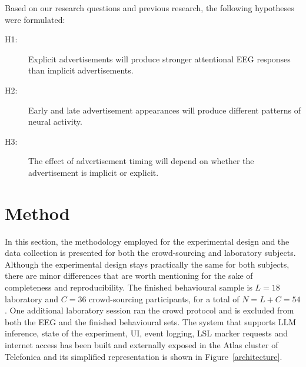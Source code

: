 \documentclass[english]{article}
\begin{document}
Based on our research questions and previous research, the following hypotheses were formulated:

\begin{description}
    \item[H1:] Explicit advertisements will produce stronger attentional EEG responses than implicit advertisements.
    \item[H2:] Early and late advertisement appearances will produce different patterns of neural activity.
    \item[H3:] The effect of advertisement timing will depend on whether the advertisement is implicit or explicit.
\end{description}


\color{black}


\section{Method}

In this section, the methodology employed for the experimental design and the data collection is presented for both the crowd-sourcing and laboratory subjects. Although the experimental design stays practically the same for both subjects, there are minor differences that are worth mentioning for the sake of completeness and reproducibility. The finished behavioural sample is $L = 18$ laboratory and $C = 36$ crowd-sourcing participants, for a total of $N = L + C = 54$. One additional laboratory session ran the crowd protocol and is excluded from both the EEG and the finished behavioural sets. The system that supports LLM inference, state of the experiment, UI, event logging, LSL marker requests and internet access has been built and externally exposed in the Atlas cluster of Telefonica and its simplified representation is shown in Figure~\ref{architecture}.
\end{document}
